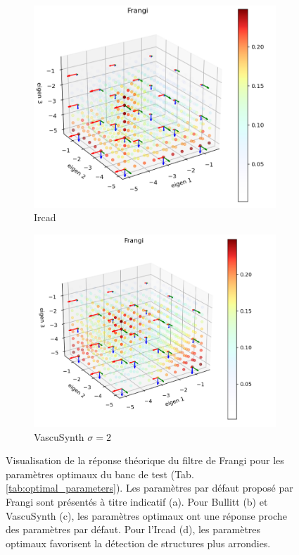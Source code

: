 \begin{figure}[!ht]
\begin{subfigure}[t]{0.45\textwidth}
  \end{subfigure}
  \begin{subfigure}[t]{0.45\textwidth}
    \centering
    \includegraphics[width=\textwidth]{Images/Ircad_Frangi_BP.png}
    \caption{Ircad}
  \end{subfigure}
  \begin{subfigure}[t]{0.45\textwidth}
    \centering
    \includegraphics[width=\textwidth]{Images/Vascu_2_Frangi_BP.png}
    \caption{VascuSynth $\sigma=2$}
  \end{subfigure}
  \caption{Visualisation de la réponse théorique du filtre de Frangi pour les paramètres optimaux du banc de test (Tab. \ref{tab:optimal_parameters}). Les paramètres par défaut proposé par Frangi sont présentés à titre indicatif (a). Pour Bullitt (b) et VascuSynth (c), les paramètres optimaux ont une réponse proche des paramètres par défaut. Pour l'Ircad (d), les paramètres optimaux favorisent la détection de structures plus arrondies.}
  \label{fig:exemple_geometry_frangi}
\end{figure}
